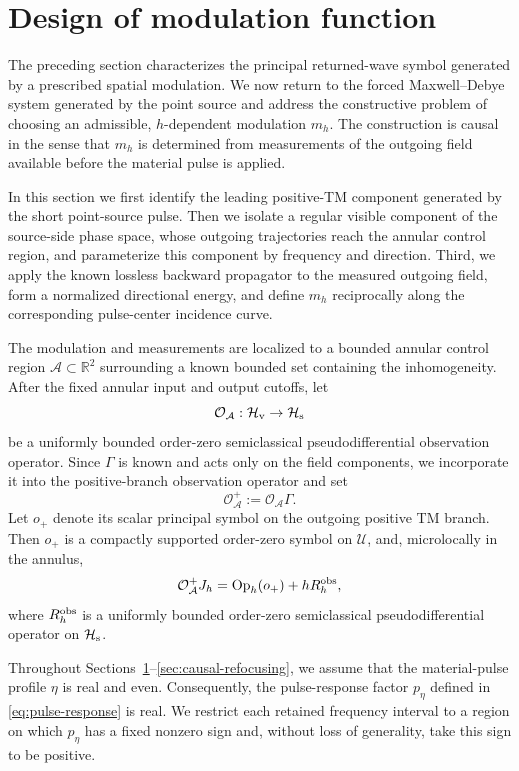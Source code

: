 \documentclass[11pt,reqno]{amsart}
\newcommand{\Op}{\operatorname{Op}}
\numberwithin{equation}{section}
\begin{document}
\section{Design of modulation function}\label{sec:necessity-tailored-annulus}

The preceding section characterizes the principal returned-wave symbol generated by a prescribed spatial modulation. We now return to the forced Maxwell--Debye system generated by the point source and address the constructive problem of choosing an admissible, $h$-dependent modulation $m_h$. The construction is causal in the sense that $m_h$ is determined from measurements of the outgoing field available before the material pulse is applied.

In this section we first identify the leading positive-TM component generated by the short point-source pulse. Then we isolate a regular visible component of the source-side phase space, whose outgoing trajectories reach the annular control region, and parameterize this component by frequency and direction. Third, we apply the known lossless backward propagator to the measured outgoing field, form a normalized directional energy, and define $m_h$ reciprocally along the corresponding pulse-center incidence curve.

The modulation and measurements are localized to a bounded annular control region $\mathcal A\subset\mathbb R^2$ surrounding a known bounded set containing the inhomogeneity. After the fixed annular input and output cutoffs, let
$$
\mathcal O_{\mathcal A}:\mathcal H_{\rm v}\to\mathcal H_{\rm s}
$$
be a uniformly bounded order-zero semiclassical pseudodifferential observation operator. Since $\Gamma$ is known and acts only on the field components, we incorporate it into the positive-branch observation operator and set
$$
\mathcal O_{\mathcal A}^+:=\mathcal O_{\mathcal A}\Gamma.
$$
Let $o_+$ denote its scalar principal symbol on the outgoing positive TM branch. Then $o_+$ is a compactly supported order-zero symbol on $\mathcal U$, and, microlocally in the annulus,
\begin{equation}\label{eq:observation-symbol-expansion}
\mathcal O_{\mathcal A}^+J_h = \Op_h(o_+)+hR_h^{\rm obs},
\end{equation}
where $R_h^{\rm obs}$ is a uniformly bounded order-zero semiclassical pseudodifferential operator on $\mathcal H_{\rm s}$.

Throughout Sections~\ref{sec:necessity-tailored-annulus}--\ref{sec:causal-refocusing}, we assume that the material-pulse profile $\eta$ is real and even. Consequently, the pulse-response factor $p_\eta$ defined in \eqref{eq:pulse-response} is real. We restrict each retained frequency interval to a region on which $p_\eta$ has a fixed nonzero sign and, without loss of generality, take this sign to be positive.
\end{document}
